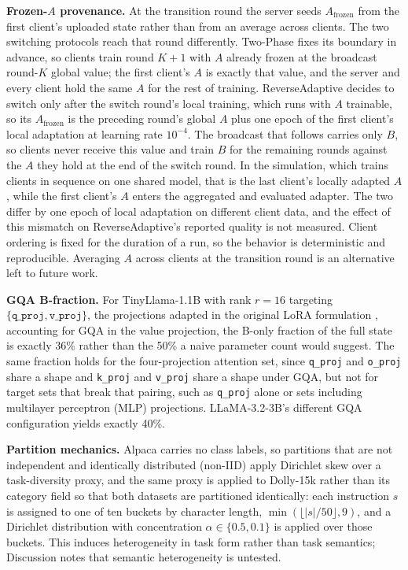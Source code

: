 \documentclass[pdflatex,sn-nature,lineno]{sn-jnl}
\begin{document}
\textbf{Frozen-$A$ provenance.} At the transition round the server seeds $A_{\text{frozen}}$ from the first client's uploaded state rather than from an average across clients. The two switching protocols reach that round differently. Two-Phase fixes its boundary in advance, so clients train round $K{+}1$ with $A$ already frozen at the broadcast round-$K$ global value; the first client's $A$ is exactly that value, and the server and every client hold the same $A$ for the rest of training. ReverseAdaptive decides to switch only after the switch round's local training, which runs with $A$ trainable, so its $A_{\text{frozen}}$ is the preceding round's global $A$ plus one epoch of the first client's local adaptation at learning rate $10^{-4}$. The broadcast that follows carries only $B$, so clients never receive this value and train $B$ for the remaining rounds against the $A$ they hold at the end of the switch round. In the simulation, which trains clients in sequence on one shared model, that is the last client's locally adapted $A$, while the first client's $A$ enters the aggregated and evaluated adapter. The two differ by one epoch of local adaptation on different client data, and the effect of this mismatch on ReverseAdaptive's reported quality is not measured. Client ordering is fixed for the duration of a run, so the behavior is deterministic and reproducible. Averaging $A$ across clients at the transition round is an alternative left to future work.

\textbf{GQA B-fraction.}
For TinyLlama-1.1B with rank $r{=}16$ targeting $\{\texttt{q\_proj}, \texttt{v\_proj}\}$, the projections adapted in the original LoRA formulation \cite{hu2022lora}, accounting for GQA in the value projection, the B-only fraction of the full state is exactly 36\% rather than the 50\% a naive parameter count would suggest. The same fraction holds for the four-projection attention set, since \texttt{q\_proj} and \texttt{o\_proj} share a shape and \texttt{k\_proj} and \texttt{v\_proj} share a shape under GQA, but not for target sets that break that pairing, such as \mbox{\texttt{q\_proj}} alone or sets including multilayer perceptron (MLP) projections. LLaMA-3.2-3B's different GQA configuration yields exactly 40\%.

\textbf{Partition mechanics.}
Alpaca carries no class labels, so partitions that are not independent and identically distributed (non-IID) apply Dirichlet skew over a task-diversity proxy, and the same proxy is applied to Dolly-15k rather than its category field so that both datasets are partitioned identically: each instruction $s$ is assigned to one of ten buckets by character length, $\min(\lfloor |s| / 50 \rfloor, 9)$, and a Dirichlet distribution with concentration $\alpha \in \{0.5, 0.1\}$ is applied over those buckets. This induces heterogeneity in task form rather than task semantics; Discussion notes that semantic heterogeneity is untested.
\end{document}

